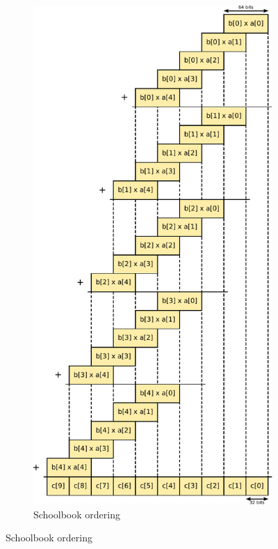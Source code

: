 \documentclass[12pt, a4paper]{report}
\begin{document}
\begin{figure}
\begin{subfigure}[h]{0.5\textwidth}
                \includegraphics[width=\textwidth]{figs/multiplication}
                \caption{Schoolbook ordering}
                \label{fig:schoolbook_multiplication_ordering}

\end{subfigure}
\end{figure}
\end{document}
